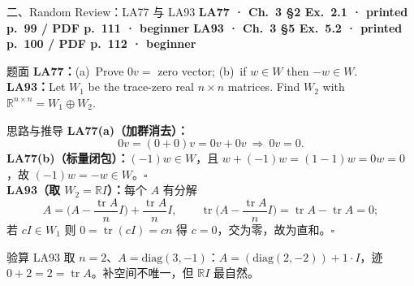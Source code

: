 \documentclass[aspectratio=169,10pt,fontset=none]{ctexbeamer}
\newcommand{\ex}[1]{\textcolor{accent}{\footnotesize\bfseries #1}}
\begin{document}
\begin{frame}[t]{二、Random Review：LA77 与 LA93}
  \leavevmode\ex{LA77 · Ch.~3 §2 Ex.~2.1 · printed p.~99 / PDF p.~111 · beginner}\quad
  \ex{LA93 · Ch.~3 §5 Ex.~5.2 · printed p.~100 / PDF p.~112 · beginner}
  \begin{block}{\footnotesize 题面}
    \scriptsize \textbf{LA77：}(a)~Prove $0v=$ zero vector; (b)~if $w\in W$ then $-w\in W$.\\
    \textbf{LA93：}Let $W_1$ be the trace-zero real $n\times n$ matrices. Find $W_2$ with $\mathbb R^{n\times n}=W_1\oplus W_2$.
  \end{block}
  \begin{exampleblock}{\footnotesize 思路与推导}
    \scriptsize
    \textbf{LA77(a)（加群消去）：}
    $$0v=(0+0)v=0v+0v\ \Longrightarrow\ 0v=0.$$
    \textbf{LA77(b)（标量闭包）：}$(-1)w\in W$，且 $w+(-1)w=(1-1)w=0w=0$，故 $(-1)w=-w\in W$。$\square$\\[3pt]
    \textbf{LA93（取 $W_2=\mathbb RI$）：}每个 $A$ 有分解
    $$A=\Big(A-\frac{\operatorname{tr}A}{n}I\Big)+\frac{\operatorname{tr}A}{n}I,\qquad \operatorname{tr}\Big(A-\frac{\operatorname{tr}A}{n}I\Big)=\operatorname{tr}A-\operatorname{tr}A=0;$$
    若 $cI\in W_1$ 则 $0=\operatorname{tr}(cI)=cn$ 得 $c=0$，交为零，故为直和。$\square$
  \end{exampleblock}
  \begin{block}{\footnotesize 验算}
    \scriptsize LA93 取 $n=2$、$A=\mathrm{diag}(3,-1)$：$A=(\mathrm{diag}(2,-2))+1\cdot I$，迹 $0+2=2=\operatorname{tr}A$。补空间不唯一，但 $\mathbb RI$ 最自然。
  \end{block}
\end{frame}
\end{document}
